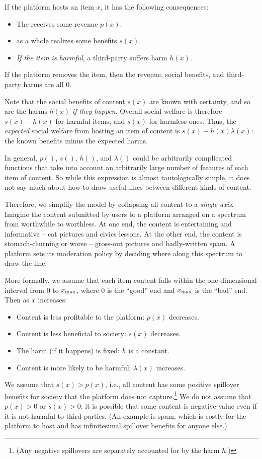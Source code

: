 If the platform hosts an item $x$, it has the following consequences:
\begin{itemize}
\item The  receives some revenue $p(x)$.
\item {} as a whole realizes some benefits $s(x)$.
\item \emph{If the item is harmful}, a third-party  suffers harm $h(x)$.
\end{itemize}
If the platform removes the item, then the revenue, social benefits, and third-party harms are all $0$.

Note that the social benefits of content $s(x)$ are known with certainty, and so are the harms $h(x)$ \emph{if they happen}. Overall social welfare is therefore $s(x) - h(x)$ for harmful items, and $s(x)$ for harmless ones.  Thus, the \emph{expected} social welfare from hosting an item of content is $s(x) - h(x)\lambda(x)$: the known benefits minus the expected harms.

In general, $p()$, $s()$, $h()$, and $\lambda()$ could be arbitrarily complicated functions that take into account an arbitrarily large number of features of each item of content. So while this expression is almost tautologically simple, it does not say much about how to draw useful lines between different kinds of content.

Therefore, we simplify the model by collapsing all content to a \emph{single axis}. Imagine the content submitted by users to a platform arranged on a spectrum from worthwhile to worthless. At one end, the content is entertaining and informative -- cat pictures and civics lessons. At the other end, the content is stomach-churning or worse -- gross-out pictures and badly-written spam. A platform sets its moderation policy by deciding where along this spectrum to draw the line.

More formally, we assume that each item content falls within the one-dimensional interval from $0$ to $x_{\text{max}}$, where $0$ is the ``good'' end and $x_{\text{max}}$ is the ``bad'' end. Then as $x$ increases:
\begin{itemize}
\item Content is less profitable to the platform: $p(x)$ decreases.
\item Content is less beneficial to society: $s(x)$ decreases.
\item The harm (if it happens) is fixed: $h$ is a constant.
\item Content is more likely to be harmful: $\lambda(x)$ increases.
\end{itemize}
We assume that $s(x) > p(x)$, i.e., all content has some positive spillover benefits for society that the platform does not capture.\footnote{(Any negative spillovers are separately accounted for by the harm $h$.)} We do not assume that $p(x) > 0$ or $s(x) > 0$: it is possible that some content is negative-value even if it is not harmful to third parties. (An example is spam, which is costly for the platform to host and has infinitesimal spillover benefits for anyone else.) 

